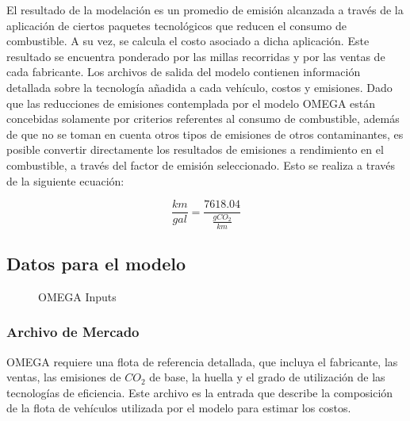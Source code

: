 El resultado de la modelación es un promedio de emisión alcanzada a través de la aplicación de ciertos paquetes tecnológicos que reducen el consumo de combustible. A su vez, se calcula el costo asociado a dicha aplicación. Este resultado se encuentra ponderado por las millas recorridas y por las ventas de cada fabricante. Los archivos de salida del modelo contienen información detallada sobre la tecnología añadida a cada vehículo, costos y emisiones. Dado que las reducciones de emisiones contemplada por el modelo OMEGA están concebidas solamente por criterios referentes al consumo de combustible, además de que no se toman en cuenta otros tipos de emisiones de otros contaminantes, es posible convertir directamente los resultados de emisiones a rendimiento en el combustible, a través del factor de emisión seleccionado. Esto se realiza a través de la siguiente ecuación: 

$$ \frac{km}{gal} = \frac{7618.04}{\frac{gCO_2}{km}}$$

\subsection{Datos para el modelo}

\begin{figure}[htbp]
   \centering
   
    \caption{OMEGA Inputs}
    \label{fig:omegafiles}
\end{figure}

\subsubsection{Archivo de Mercado}

OMEGA requiere una flota de referencia detallada, que incluya el fabricante, las ventas, las emisiones de $CO_2$ de base, la huella y el grado de utilización de las tecnologías de eficiencia. Este archivo es la entrada que describe la composición de la flota de vehículos utilizada por el modelo
para estimar los costos.

